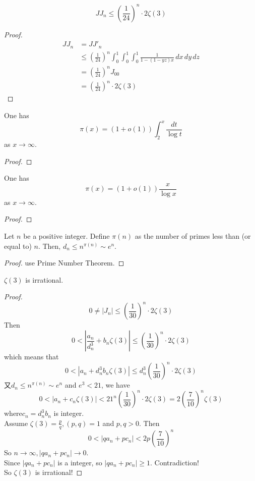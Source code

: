 \begin{theorem}\label{JJ_upper}
    \[ JJ_n \leqslant (\frac{1}{24})^n\cdot 2\zeta(3) \]
\end{theorem}
\begin{proof}
    \leanok
    \begin{align*}
        JJ_n &= JJ'_n \\
        &\leqslant (\frac{1}{24})^n \int_{0}^{1}\int_{0}^{1}\int_{0}^{1} \frac{1}{1-(1-yz)x} \, dx \, dy \, dz \\
        &= (\frac{1}{24})^n J_{00} \\
        &= (\frac{1}{24})^n \cdot 2\zeta(3)
    \end{align*}
\end{proof}

\begin{lemma}\label{pi_asymp}
  One has
  $$ \pi(x) = (1+o(1)) \int_2^x \frac{dt}{\log t}$$
  as $x \to \infty$.
\end{lemma}
\begin{proof}
    \leanok
\end{proof}

\begin{lemma}\label{pi_alt}
    One has 
    \[ \pi(x) = (1 + o(1))\frac{x}{\log x}\]
    as $x \rightarrow \infty$.
\end{lemma}
\begin{proof}
    \leanok
\end{proof}

\begin{lemma}\label{dn_asymptotic}
    Let $n$ be a positive integer. Define $\pi(n)$ as the number of primes less than (or equal to) $n$. Then, $d_n \leqslant n^{\pi(n)} \sim e^n$.
\end{lemma}
\begin{proof}
    \leanok
    use Prime Number Theorem. 
\end{proof}

\begin{theorem}\label{zeta_3_irrational}
    $\zeta(3)$ is irrational.
\end{theorem}
\begin{proof}
    \leanok
    \[ 0 \neq |J_n| \leqslant (\frac{1}{30})^n\cdot 2\zeta(3) \]
    Then 
    \[ 0 < |\frac{a_n}{d_n^3} + b_n\zeta(3)| \leqslant (\frac{1}{30})^n\cdot 2\zeta(3) \]
    which means that 
    \[ 0 < |a_n + d_n^3 b_n\zeta(3)| \leqslant d_n^3(\frac{1}{30})^n\cdot 2\zeta(3) \] 
    又$d_n \leqslant n^{\pi(n)} \sim e^n$ and $e^3 < 21$, we have
    \[ 0 < |a_n + c_n\zeta(3)| < 21^n (\frac{1}{30})^n\cdot 2\zeta(3) = 2(\frac{7}{10})^n \zeta(3) \]
    where$c_n = d_n^3 b_n$ is integer.\\
    Assume $\zeta(3) = \frac{p}{q}, (p,q)=1$ and $p,q>0$. Then 
    \[ 0 < |qa_n + pc_n| < 2p (\frac{7}{10})^n \]
    So $n \rightarrow \infty, |qa_n + pc_n| \rightarrow 0$.\\
    Since $|qa_n + pc_n|$ is a integer, so $|qa_n + pc_n| \geqslant 1$. Contradiction! \\
    So $\zeta(3)$ is irrational!
\end{proof}